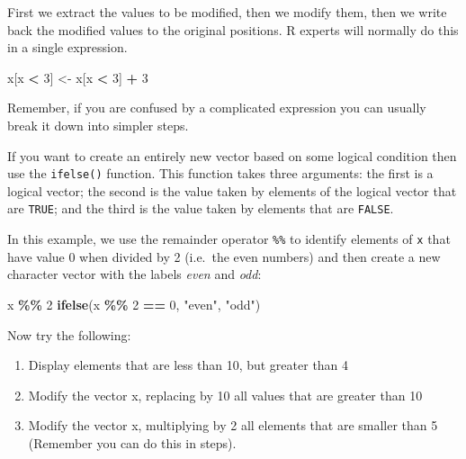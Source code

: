 \documentclass[
]{book}
\newenvironment{Shaded}{\begin{snugshade}}{\end{snugshade}}
\newcommand{\DecValTok}[1]{\textcolor[rgb]{0.00,0.00,0.81}{#1}}
\newcommand{\FunctionTok}[1]{\textcolor[rgb]{0.13,0.29,0.53}{\textbf{#1}}}
\newcommand{\NormalTok}[1]{#1}
\newcommand{\OtherTok}[1]{\textcolor[rgb]{0.56,0.35,0.01}{#1}}
\newcommand{\SpecialCharTok}[1]{\textcolor[rgb]{0.81,0.36,0.00}{\textbf{#1}}}
\newcommand{\StringTok}[1]{\textcolor[rgb]{0.31,0.60,0.02}{#1}}
\providecommand{\tightlist}{%
  \setlength{\itemsep}{0pt}\setlength{\parskip}{0pt}}
\begin{document}
First we extract the values to be modified, then we modify them, then we
write back the modified values to the original positions. R experts will
normally do this in a single expression.

\begin{Shaded}
\begin{Highlighting}[]
\NormalTok{x[x }\SpecialCharTok{\textless{}} \DecValTok{3}\NormalTok{] }\OtherTok{\textless{}{-}}\NormalTok{ x[x }\SpecialCharTok{\textless{}} \DecValTok{3}\NormalTok{] }\SpecialCharTok{+} \DecValTok{3}
\end{Highlighting}
\end{Shaded}

Remember, if you are confused by a complicated expression you can usually
break it down into simpler steps.

If you want to create an entirely new vector based on some logical
condition then use the \texttt{ifelse()} function. This function takes
three arguments: the first is a logical vector; the second is the
value taken by elements of the logical vector that are \texttt{TRUE}; and
the third is the value taken by elements that are \texttt{FALSE}.

In this example, we use the remainder operator \texttt{\%\%} to identify
elements of \texttt{x} that have value 0 when divided by 2 (i.e.~the even numbers)
and then create a new character vector with the labels \emph{even} and \emph{odd}:

\begin{Shaded}
\begin{Highlighting}[]
\NormalTok{x }\SpecialCharTok{\%\%} \DecValTok{2}
\FunctionTok{ifelse}\NormalTok{(x }\SpecialCharTok{\%\%} \DecValTok{2} \SpecialCharTok{==} \DecValTok{0}\NormalTok{, }\StringTok{"even"}\NormalTok{, }\StringTok{"odd"}\NormalTok{)}
\end{Highlighting}
\end{Shaded}

Now try the following:

\begin{enumerate}
\def\labelenumi{\arabic{enumi}.}
\tightlist
\item
  Display elements that are less than 10, but greater than 4
\item
  Modify the vector x, replacing by 10 all values that are greater than 10
\item
  Modify the vector x, multiplying by 2 all elements that are smaller than 5 (Remember you can do this in steps).
\end{enumerate}
\end{document}
